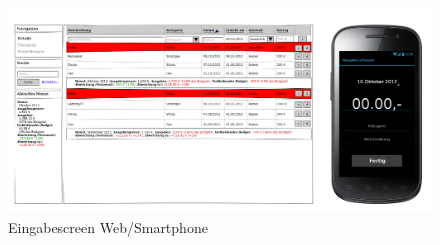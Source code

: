 \begin{figure}[htl]
\centering
\includegraphics[width=\textwidth]{img/smartphone_web_comparison}
\caption{Eingabescreen Web/Smartphone}
\label{fig:smartphone_web_comparison}
\end{figure}
